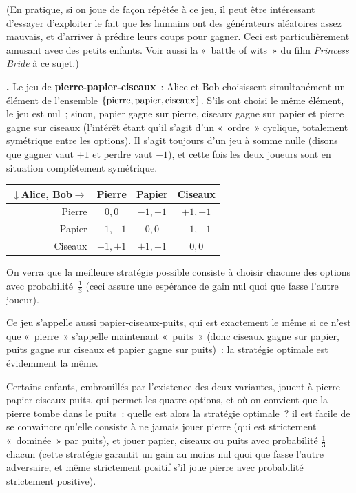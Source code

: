 \documentclass[12pt,a4paper]{article}
\theoremstyle{definition}
\newcommand\thingy{%
\refstepcounter{comcnt}\smallskip\noindent\textbf{\thecomcnt.} }
\newcommand{\defin}[2][]{\def\latexsucks{#1}\ifx\latexsucks\empty\index{#2}\else\index{\latexsucks}\fi\textbf{#2}}
\begin{document}
(En pratique, si on joue de façon répétée à ce jeu, il peut être
intéressant d'essayer d'exploiter le fait que les humains ont des
générateurs aléatoires assez mauvais, et d'arriver à prédire leurs
coups pour gagner.  Ceci est particulièrement amusant avec des petits
enfants.  Voir aussi la « battle of wits » du film \textit{Princess
  Bride} à ce sujet.)

\thingy\label{rock-paper-scissors} Le jeu de
\defin{pierre-papier-ciseaux} : Alice et Bob choisissent
simultanément un élément de l'ensemble $\{\textrm{pierre},\penalty0
\textrm{papier},\penalty0 \textrm{ciseaux}\}$.  S'ils ont choisi le
même élément, le jeu est nul ; sinon, papier gagne sur pierre, ciseaux
gagne sur papier et pierre gagne sur ciseaux (l'intérêt étant qu'il
s'agit d'un « ordre » cyclique, totalement symétrique entre les
options).  Il s'agit toujours d'un jeu à somme nulle (disons que
gagner vaut $+1$ et perdre vaut $-1$), et cette fois les deux joueurs
sont en situation complètement symétrique.

\begin{center}
\begin{tabular}{r|ccc}
$\downarrow$Alice, Bob$\rightarrow$&Pierre&Papier&Ciseaux\\\hline
Pierre&$0,0$&$-1,+1$&$+1,-1$\\
Papier&$+1,-1$&$0,0$&$-1,+1$\\
Ciseaux&$-1,+1$&$+1,-1$&$0,0$\\
\end{tabular}
\end{center}

On verra que la meilleure stratégie possible consiste à choisir
chacune des options avec probabilité $\frac{1}{3}$ (ceci assure une
espérance de gain nul quoi que fasse l'autre joueur).

Ce jeu s'appelle aussi papier-ciseaux-puits, qui est exactement le
même si ce n'est que « pierre » s'appelle maintenant « puits » (donc
ciseaux gagne sur papier, puits gagne sur ciseaux et papier gagne sur
puits) : la stratégie optimale est évidemment la même.

Certains enfants, embrouillés par l'existence des deux variantes,
jouent à pierre-papier-ciseaux-puits, qui permet les quatre options,
et où on convient que la pierre tombe dans le puits : quelle est alors
la stratégie optimale ? il est facile de se convaincre qu'elle
consiste à ne jamais jouer pierre (qui est strictement « dominée » par
puits), et jouer papier, ciseaux ou puits avec probabilité
$\frac{1}{3}$ chacun (cette stratégie garantit un gain au moins nul
quoi que fasse l'autre adversaire, et même strictement positif s'il
joue pierre avec probabilité strictement positive).
\end{document}
